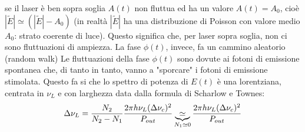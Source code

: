 se il laser è ben sopra soglia $A(t)$ non fluttua ed ha un valore $A(t) = A_0$, cioè $\left|\tilde{E}\right| \simeq \left(\left|\tilde{E}\right| - A_0\right)$
(in realtà $\left|\tilde{E}\right|$ ha una distribuzione di Poisson con valore medio $A_0$: strato coerente di luce). Questo significa che, per laser sopra soglia, non ci sono fluttuazioni di ampiezza. La fase $\phi(t)$, invece, fa un cammino aleatorio (random walk)
Le fluttuazioni della fase $\phi(t)$ sono dovute ai fotoni di emissione spontanea che, di tanto in tanto, vanno a "sporcare" i fotoni di emissione stimolata. Questo fa si che lo spettro di potenza di $E(t)$ è una lorentziana, centrata in $\nu_L$ e con larghezza data dalla formula di Scharlow e Townes:
\begin{equation*}
\Delta\nu_L = \frac{N_2}{N_2 - N_1} \frac{2\pi h\nu_L (\Delta\nu_c)^2}{P_{out}} \underbrace{\simeq}_{N_1 \simeq 0} \frac{2\pi h \nu_L (\Delta\nu_c)^2}{P_{out}}
\end{equation*}

